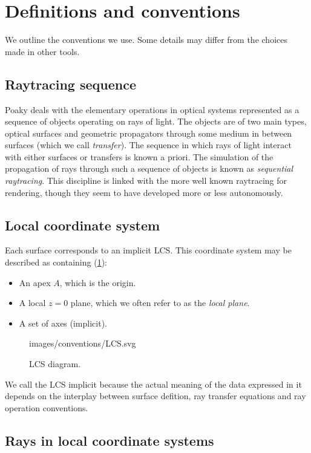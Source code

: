 \section{Definitions and conventions}
We outline the conventions we use. Some details may differ from the choices
made in other tools.

\subsection{Raytracing sequence}
Poaky deals with the elementary operations in optical systems represented as a
sequence of objects operating on rays of light. The objects are of
two main types, optical surfaces and geometric propagators through some medium
in between surfaces (which we call \emph{transfer}). The sequence in which rays
of light interact with either surfaces or transfers is known a priori. The
simulation of the propagation of rays through such a sequence of objects is
known as \emph{sequential raytracing}. This discipline is linked with the more
well known raytracing for rendering, though they seem to have developed more or
less autonomously.

\subsection{Local coordinate system} \label{sec:LCS}
Each surface corresponds to an implicit \gls{LCS}.
This coordinate system may be described as containing (\cref{fig:LCS}):

\begin{itemize}
\item An apex $A$, which is the origin.
\item A local $z=0$ plane, which we often refer to as the \emph{local plane}.
\item A set of axes (implicit).
\end{itemize}

\begin{figure} \caption{\label{fig:LCS} LCS diagram.}

           {images/conventions/LCS.svg}
\end{figure}

We call the \gls{LCS} implicit because the actual meaning of the data
expressed in it depends on the interplay between surface defition, ray
transfer equations and ray operation conventions.

\subsection{Rays in local coordinate systems}

